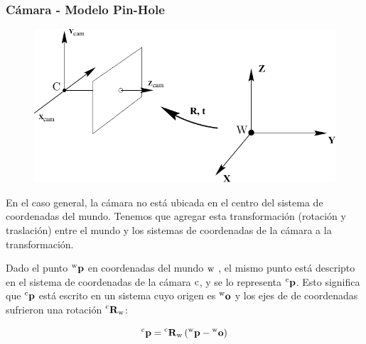 \begin{frame}
    \frametitle{Cámara - Modelo Pin-Hole}
    
    \footnotesize
    
    \begin{figure}[!h]
        \includegraphics[width=0.4\columnwidth]{images/camera/camera_world_coordinate.pdf}
    \end{figure}
    
    En el caso general, la cámara no está ubicada en el centro del sistema de coordenadas del mundo. Tenemos que agregar esta transformación (rotación y traslación) entre el mundo y los sistemas de coordenadas de la cámara a la transformación.
    
    Dado el punto $\prescript{\mathrm{\mathrm{w}}}{}{\boldsymbol{\mathbf{p}}}$ en coordenadas del mundo $\mathrm{w}$ , el mismo punto está descripto en el sistema de coordenadas de la cámara $\mathrm{c}$, y se lo representa $\prescript{\mathrm{\mathrm{c}}}{}{\boldsymbol{\mathbf{p}}}$. Esto significa que $\prescript{\mathrm{\mathrm{c}}}{}{\boldsymbol{\mathbf{p}}}$ está escrito en un sistema cuyo origen es $\prescript{\mathrm{\mathrm{w}}}{}{\boldsymbol{\mathbf{o}}}$ y los ejes de de coordenadas sufrieron una rotación $\prescript{\mathrm{\mathrm{c}}}{}{{\boldsymbol{\mathbf{R}}}_\mathrm{\mathrm{w}}}$:
    
    \begin{equation*}
        \prescript{\mathrm{\mathrm{c}}}{}{\boldsymbol{\mathbf{p}}} = \prescript{\mathrm{\mathrm{c}}}{}{{\boldsymbol{\mathbf{R}}}_\mathrm{\mathrm{w}}} \left( \prescript{\mathrm{\mathrm{w}}}{}{\boldsymbol{\mathbf{p}}} - \prescript{\mathrm{\mathrm{w}}}{}{\boldsymbol{\mathbf{o}}} \right)
    \end{equation*}

\end{frame}

